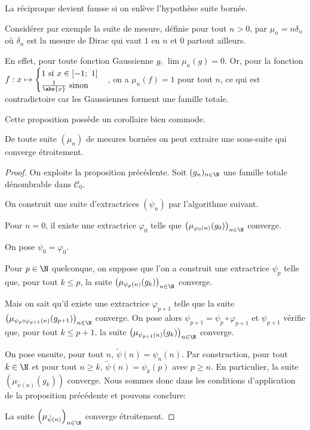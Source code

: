 \begin{listremarques}
\item
La réciproque devient fausse si on enlève l'hypothèse \og suite bornée. \fg{}

Considérer par exemple la suite de mesure, définie pour tout $n > 0$, par $\mu_n = n \delta_n$ où $\delta_n$ est la mesure de Dirac qui vaut $1$ en $n$ et $0$ partout ailleurs.

En effet, pour toute fonction Gaussienne $g$, $\lim \mu_n(g) = 0$. Or, pour la fonction $f: x \mapsto \begin{cases}
1 \text{ si }x \in [-1;~1] \\
\frac{1}{\abs{x}} \text{ sinon} 
\end{cases}$, on a $\mu_n(f) = 1$ pour tout $n$, ce qui est contradictoire car les Gaussiennes forment une famille totale.
\end{listremarques}

Cette proposition possède un corollaire bien commode.

\begin{cor}
De toute suite $(\mu_n)$ de mesures bornées on peut extraire une sous-suite qui converge étroitement.
\end{cor}



\begin{proof}
On exploite la proposition précédente. Soit $(g_n)_{n \in \N}$ une famille totale dénombrable dans $\mathcal{C}_0$.

\medskip
On construit une suite d'extractrices $(\psi_n)$ par l'algorithme suivant.

\medskip
Pour $n=0$, il existe une extractrice $\varphi_0$ telle que $\left (\mu_{\varphi_0(n)}(g_0)\right )_{n \in \N}$ converge.

On pose $\psi_0 = \varphi_0$.

\medskip
Pour $p \in \N$ quelconque, on suppose que l'on a construit une extractrice $\psi_p$ telle que, pour tout $k \leq p$, la suite $\left (\mu_{\psi_p(n)}(g_k) \right )_{n \in \N}$ converge.

\medskip
Mais on sait qu'il existe une extractrice $\varphi_{p+1}$ telle que la suite $\left (\mu_{\psi_p \circ \varphi_{p+1} (n)}(g_{p+1}) \right )_{n \in \N}$ converge. On pose alors $\psi_{p+1} = \psi_p \circ \varphi_{p+1}$ et $\psi_{p+1}$ vérifie que, pour tout $k \leq p+1$, la suite $\left (\mu_{\psi_{p+1}(n)}(g_k) \right )_{n \in \N}$ converge.

\medskip
On pose ensuite, pour tout $n$, $\tilde{\psi}(n) = \psi_n(n)$. Par construction, pour tout $k \in \N$ et pour tout $n \geq k$, $\tilde{\psi}(n) = \psi_k(p)$ avec $p \geq n$. En particulier, la suite $\left ( \mu_{\tilde{\psi}(n)}(g_k)\right )$ converge. Nous sommes donc dans les conditions d'application de la proposition précédente et pouvons conclure:

La suite $\left ( \mu_{\tilde{\psi}(n)}\right )_{n \in \N}$ converge étroitement.
\end{proof}


